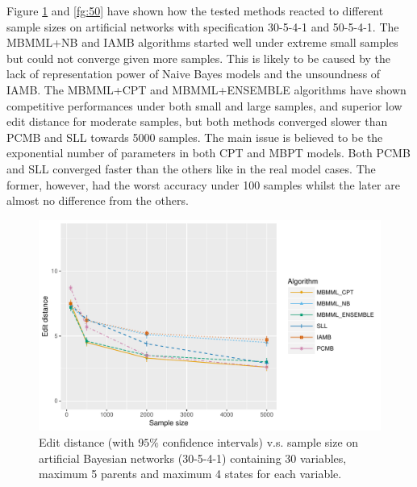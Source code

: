 \documentclass{svmult}
\begin{document}
Figure \ref{fg:30} and \ref{fg:50} have shown how the tested methods reacted to different sample sizes on artificial networks with specification 30-5-4-1 and 50-5-4-1. The MBMML+NB and IAMB algorithms started well under extreme small samples but could not converge given more samples. This is likely to be caused by the lack of representation power of Naive Bayes models and the unsoundness of IAMB. The MBMML+CPT and MBMML+ENSEMBLE algorithms have shown competitive performances under both small and large samples, and superior low edit distance for moderate samples, but both methods converged slower than PCMB and SLL towards 5000 samples. The main issue is believed to be the exponential number of parameters in both CPT and MBPT models. Both PCMB and SLL converged faster than the others like in the real model cases. The former, however, had the worst accuracy under 100 samples whilst the later are  almost no difference from the others. 
\begin{figure}[hbt]
  \centering
    \includegraphics[scale=0.6]{figures/ed_vs_samplesize_30_5_4_1.pdf}
  \caption{Edit distance (with $95\%$ confidence intervals) v.s. sample size on artificial Bayesian networks (30-5-4-1) containing 30 variables, maximum 5 parents and maximum 4 states for each variable.}
  \label{fg:30}
\end{figure}
\end{document}
